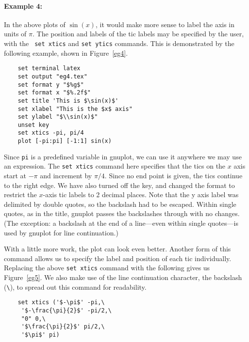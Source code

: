 \paragraph{Example 4:} In the above plots of $\sin(x)$, it would make
more sense to label the axis in units of $\pi$. The position and
labels of the tic labels may be specified by the user, with the {\tt
set xtics} and {\tt set ytics} commands. This is demonstrated by
the following example, shown in Figure~\ref{eg4}.

\singlespace
\begin{verbatim}
    set terminal latex
    set output "eg4.tex"
    set format y "$%g$"
    set format x "$%.2f$"
    set title 'This is $\sin(x)$'
    set xlabel "This is the $x$ axis"
    set ylabel "$\\sin(x)$"
    unset key
    set xtics -pi, pi/4
    plot [-pi:pi] [-1:1] sin(x)
\end{verbatim}
\currentspace


Since {\tt pi} is a predefined variable in gnuplot, we can use it
anywhere we may use an expression. The {\tt set xtics} command here
specifies that the tics on the $x$ axis start at $-\pi$ and increment
by $\pi/4$. Since no end point is given, the tics continue to the
right edge. We have also turned off the key, and changed the format to
restrict the $x$-axis tic labels to 2 decimal places.  Note that the
y axis label was delimited by double quotes, so the
backslash had to be escaped.  Within single quotes, as in the title,
gnuplot passes the backslashes through with no changes.
(The exception: a backslash at the end of a line---even within single
quotes---is used by gnuplot for line continuation.)

With a little more work, the plot can look even better.  Another form
of this command allows us to specify the label and position of each
tic individually.  Replacing the above {\tt set xtics} command with
the following gives us Figure~\ref{eg5}. We also make use of the line
continuation character, the backslash (\verb+\+), to spread out this
command for readability.

\singlespace
\begin{verbatim}
    set xtics ('$-\pi$' -pi,\
     '$-\frac{\pi}{2}$' -pi/2,\
     "0" 0,\
     '$\frac{\pi}{2}$' pi/2,\
     '$\pi$' pi)
\end{verbatim}
\currentspace

